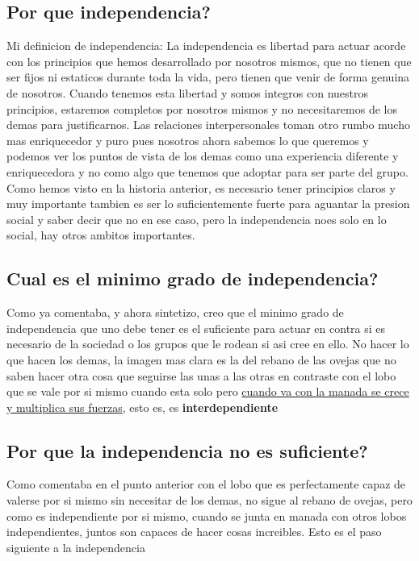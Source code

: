 \subsection{Por que independencia?}
Mi definicion de independencia:
La independencia es libertad para actuar acorde con los principios que hemos desarrollado por nosotros mismos, que no tienen que ser fijos ni estaticos durante toda la vida, pero tienen que venir de forma genuina de nosotros. Cuando tenemos esta libertad y somos integros con nuestros principios, estaremos completos por nosotros mismos y no necesitaremos de los demas para justificarnos. Las relaciones interpersonales toman otro rumbo mucho mas enriquecedor y puro pues nosotros ahora sabemos lo que queremos y podemos ver los puntos de vista de los demas como una experiencia diferente y enriquecedora y no como algo que tenemos que adoptar para ser parte del grupo.
Como hemos visto en la historia anterior, es necesario tener principios claros y muy importante tambien es ser lo suficientemente fuerte para aguantar la presion social y saber decir que no en ese caso, pero la independencia noes solo en lo social, hay otros ambitos importantes.
\subsection{Cual es el minimo grado de independencia?}
Como ya comentaba, y ahora sintetizo, creo que el minimo grado de independencia que uno debe tener es el suficiente para actuar en contra si es necesario de la sociedad o los grupos que le rodean si asi cree en ello. No hacer lo que hacen los demas, la imagen mas clara es la del rebano de las ovejas que no saben hacer otra cosa que seguirse las unas a las otras en contraste con el lobo que se vale por si mismo cuando esta solo pero \underline{cuando va con la manada se crece y multiplica sus fuerzas}, esto es, es \textbf{interdependiente}
\subsection{Por que la independencia no es suficiente?}
Como comentaba en el punto anterior con el lobo que es perfectamente capaz de valerse por si mismo sin necesitar de los demas, no sigue al rebano de ovejas, pero como es independiente por si mismo, cuando se junta en manada con otros lobos independientes, juntos son capaces de hacer cosas increibles.
Esto es el paso siguiente a la independencia

